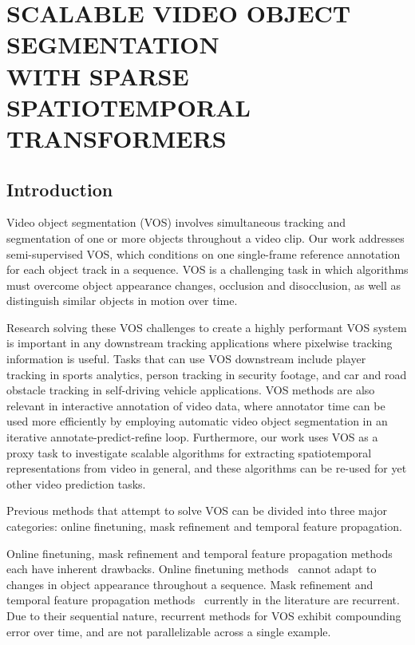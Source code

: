 \chapter{SCALABLE VIDEO OBJECT SEGMENTATION \\
         WITH SPARSE SPATIOTEMPORAL TRANSFORMERS}


\section{Introduction}

Video object segmentation (VOS) involves simultaneous tracking and segmentation
of one or more objects throughout a video clip.
Our work addresses semi-supervised VOS, which conditions on one single-frame
reference annotation for each object track in a sequence.
VOS is a challenging task in which algorithms must overcome object appearance
changes, occlusion and disocclusion, as well as distinguish similar objects in
motion over time.

Research solving these VOS challenges to create a highly performant VOS system
is important in any downstream tracking applications where pixelwise tracking
information is useful.
Tasks that can use VOS downstream include player tracking in sports analytics,
person tracking in security footage, and car and road obstacle tracking in
self-driving vehicle applications.
VOS methods are also relevant in interactive annotation of video data, where
annotator time can be used more efficiently by employing automatic video object
segmentation in an iterative annotate-predict-refine loop.
Furthermore, our work uses VOS as a proxy task to investigate scalable
algorithms for extracting spatiotemporal representations from video in general,
and these algorithms can be re-used for yet other video prediction tasks.

Previous methods that attempt to solve VOS can be divided into three major
categories: online finetuning, mask refinement and temporal feature
propagation.

Online finetuning, mask refinement and temporal feature propagation methods
each have inherent drawbacks.
Online finetuning methods~\cite{caelles2017one} cannot adapt to changes in
object appearance throughout a sequence.
Mask refinement and temporal feature propagation methods~\cite{ventura2019rvos}
currently in the literature are recurrent.
Due to their sequential nature, recurrent methods for VOS exhibit compounding
error over time, and are not parallelizable across a single example.

